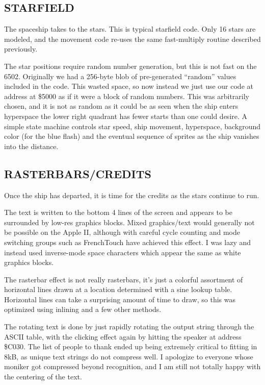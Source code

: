 \documentclass[twocolumn]{article}
\begin{document}
\subsection{STARFIELD}

The spaceship takes to the stars.
This is typical starfield code.
Only 16 stars are modeled, and the movement code re-uses the 
same fast-multiply routine described previously.

The star positions require random number generation, but this is not
fast on the 6502.
Originally we had a 256-byte blob of pre-generated ``random'' values
included in the code.
This wasted space, so now instead we just use our code at address
at \$5000 as if it were a block of random numbers.
This was arbitrarily chosen, and it is not as random as it could be
as seen when the ship enters hyperspace the lower right quadrant has fewer
starts than one could desire.
A simple state machine controls star speed, ship movement, hyperspace,
background color (for the blue flash) and the eventual sequence of sprites
as the ship vanishes into the distance.

\subsection{RASTERBARS/CREDITS}

Once the ship has departed, it is time for the credits as the stars
continue to run.

The text is written to the bottom 4 lines of the screen and appears
to be surrounded by low-res graphics blocks.
Mixed graphics/text would generally not be possible on the Apple II, although
with careful cycle counting and mode switching groups such as FrenchTouch
have achieved this effect.
I was lazy and instead used inverse-mode space characters which appear the same
as white graphics blocks.

The rasterbar effect is not really rasterbars, it's just a colorful assortment
of horizontal lines drawn at a location determined with a sine lookup table.
Horizontal lines can take a surprising amount of time to draw, so this
was optimized using inlining and a few other methods.

The rotating text is done by just rapidly rotating the output string through
the ASCII table, with the clicking effect again by hitting the speaker
at address \$C030.
The list of people to thank ended up being extremely critical to fitting in 8kB,
as unique text strings do not compress well.  
I apologize to everyone whose moniker got compressed beyond recognition,
and I am still not totally happy with the centering of the text.
\end{document}
